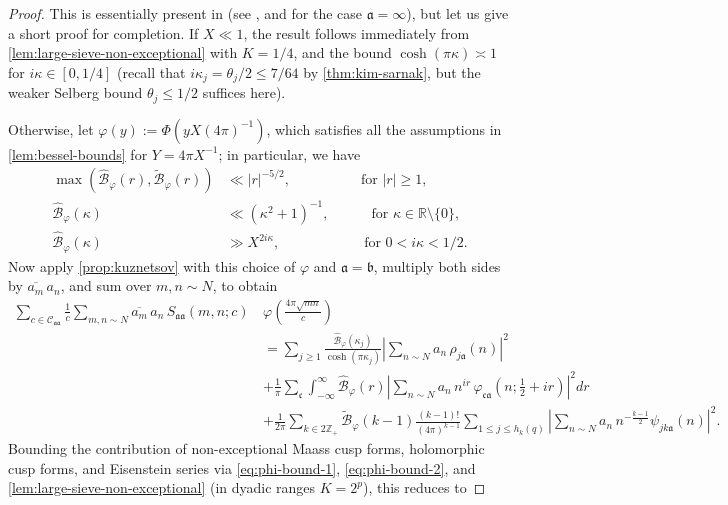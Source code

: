 \documentclass[reqno,11pt]{amsart}
\theoremstyle{remark}
\numberwithin{equation}{section}
\newcommand{\Z}{\mathbb{Z}}
\newcommand{\R}{\mathbb{R}}
\newcommand{\mB}{\mathcal{B}}
\newcommand{\mC}{\mathcal{C}}
\newcommand{\ma}{\mathfrak{a}}
\newcommand{\mb}{\mathfrak{b}}
\newcommand{\mc}{\mathfrak{c}}
\renewcommand{\bar}{\overline}
\renewcommand{\hat}{\widehat}
\renewcommand{\tilde}{\widetilde}
\newcommand{\ch}{\cosh}
\begin{document}
\begin{proof}
This is essentially present in \cite{deshouillers1982kloosterman} (see \cite[first display on p.\,271]{deshouillers1982kloosterman}, and \cite[(8.7)]{deshouillers1982kloosterman} for the case $\ma = \infty$), but let us give a short proof for completion. If $X \ll 1$, the result follows immediately from \cref{lem:large-sieve-non-exceptional} with $K = 1/4$, and the bound $\cosh(\pi \kappa) \asymp 1$ for $i\kappa \in [0, 1/4]$ (recall that $i \kappa_j = \theta_j /2 \le 7/64$ by \cref{thm:kim-sarnak}, but the weaker Selberg bound $\theta_j \le 1/2$ suffices here).

Otherwise, let $\varphi(y) := \Phi(yX(4\pi)^{-1})$, which satisfies all the assumptions in \cref{lem:bessel-bounds} for $Y = 4\pi X^{-1}$; in particular, we have
\begin{align}
    \label{eq:phi-bound-1}
    \max(\hat{\mB}_\varphi(r), \tilde{\mB}_\varphi(r)) &\ll |r|^{-5/2}, \qquad\qquad\quad \text{for } |r| \ge 1,
    \\ 
    \label{eq:phi-bound-2}
    \hat{\mB}_\varphi(\kappa) &\ll \left(\kappa^2 + 1\right)^{-1}, \qquad\quad \text{for } \kappa \in \R \setminus \{0\},
    \\
    \label{eq:phi-bound-3}
    \hat{\mB}_\varphi(\kappa) &\gg X^{2i\kappa}, \qquad\qquad\qquad \text{for } 0 < i \kappa < 1/2.
\end{align}
Now apply \cref{prop:kuznetsov} with this choice of $\varphi$ and $\ma = \mb$, multiply both sides by $\bar{a_m}\, a_n$, and sum over $m, n \sim N$, to obtain
\[
\begin{aligned}
    \sum_{c \in \mC_{\ma\ma}} \frac{1}{c} 
    \sum_{m,n \sim N} \bar{a_m}\, a_n\, S_{\ma \ma}(m, n; c)\, &\varphi\left(\frac{4\pi \sqrt{mn}}{c} \right)
    \\
    &= 
    \sum_{j \ge 1} \frac{\hat{\mB}_\varphi(\kappa_j)}{\ch(\pi \kappa_j)} \left\vert \sum_{n \sim N} a_n\, \rho_{j\ma}(n) \right\vert^2
    \\
    &+
    \frac{1}{\pi} 
    \sum_{\mc} \int_{-\infty}^\infty \hat{\mB}_\varphi(r) \left\vert \sum_{n \sim N} a_n\, n^{ir}\, \varphi_{\mc \ma}\left(n; \frac{1}{2} + ir\right) \right\vert^2 dr
    \\
    &+\frac{1}{2\pi} 
    \sum_{k \in 2\Z_+}
    \tilde{\mB}_\varphi(k-1)
    \frac{(k-1)!}{(4\pi)^{k-1}} 
    \sum_{1 \le j \le h_k(q)} \left\vert \sum_{n \sim N} a_n\, n^{-\frac{k-1}{2}} \psi_{jk\ma}(n) \right\vert^2 .
\end{aligned}
\]
Bounding the contribution of non-exceptional Maass cusp forms, holomorphic cusp forms, and Eisenstein series via \cref{eq:phi-bound-1}, \cref{eq:phi-bound-2}, and \cref{lem:large-sieve-non-exceptional} (in dyadic ranges $K = 2^p$), this reduces to

\end{proof}
\end{document}
